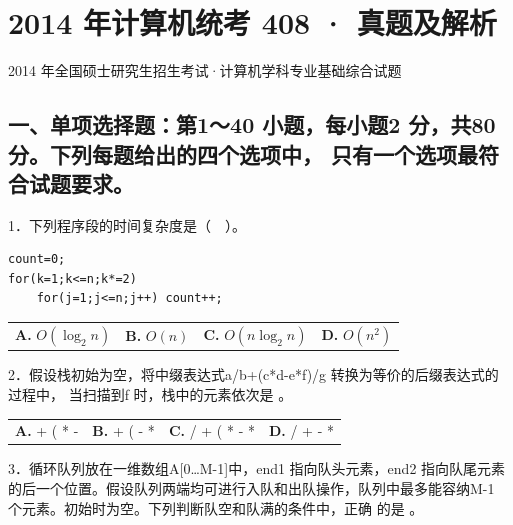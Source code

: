 \documentclass[UTF8,11pt]{ctexart}
\begin{document}
\section*{2014 年计算机统考 408 · 真题及解析}
2014 年全国硕士研究生招生考试·计算机学科专业基础综合试题


\subsection*{一、单项选择题：第1～40 小题，每小题2 分，共80 分。下列每题给出的四个选项中， 只有一个选项最符合试题要求。}

1．下列程序段的时间复杂度是（　）。


\begin{Verbatim}[breaklines,breakanywhere,fontsize=\small]
count=0;
for(k=1;k<=n;k*=2)
    for(j=1;j<=n;j++) count++;
\end{Verbatim}

\begin{center}\begin{tabular}{>{\raggedright\arraybackslash}p{\dimexpr(\linewidth-8\tabcolsep)/4\relax}>{\raggedright\arraybackslash}p{\dimexpr(\linewidth-8\tabcolsep)/4\relax}>{\raggedright\arraybackslash}p{\dimexpr(\linewidth-8\tabcolsep)/4\relax}>{\raggedright\arraybackslash}p{\dimexpr(\linewidth-8\tabcolsep)/4\relax}}
\textbf{A.} \(\displaystyle O(\log_2 n)\) & \textbf{B.} \(\displaystyle O(n)\) & \textbf{C.} \(\displaystyle O(n\log_2 n)\) & \textbf{D.} \(\displaystyle O(n^2)\)\\[.35em]\end{tabular}\end{center}

2．假设栈初始为空，将中缀表达式a/b+(c*d-e*f)/g 转换为等价的后缀表达式的过程中， 当扫描到f 时，栈中的元素依次是 。


\begin{center}\begin{tabular}{>{\raggedright\arraybackslash}p{\dimexpr(\linewidth-8\tabcolsep)/4\relax}>{\raggedright\arraybackslash}p{\dimexpr(\linewidth-8\tabcolsep)/4\relax}>{\raggedright\arraybackslash}p{\dimexpr(\linewidth-8\tabcolsep)/4\relax}>{\raggedright\arraybackslash}p{\dimexpr(\linewidth-8\tabcolsep)/4\relax}}
\textbf{A.} + ( * - & \textbf{B.} + ( - * & \textbf{C.} / + ( * - * & \textbf{D.} / + - *\\[.35em]\end{tabular}\end{center}

3．循环队列放在一维数组A[0…M-1]中，end1 指向队头元素，end2 指向队尾元素的后一个位置。假设队列两端均可进行入队和出队操作，队列中最多能容纳M-1 个元素。初始时为空。下列判断队空和队满的条件中，正确 的是 。
\end{document}
